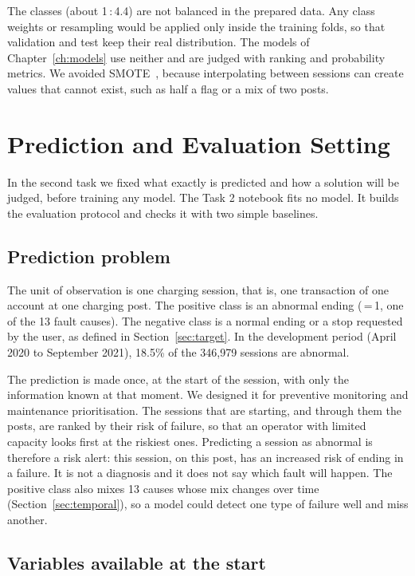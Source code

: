 \documentclass[12pt,a4paper,openany]{report}
\begin{document}
The classes (about 1\,:\,4.4) are not balanced in the prepared data. Any class weights or resampling would be
applied only inside the training folds, so that validation and test keep their real distribution. The models of
Chapter~\ref{ch:models} use neither and are judged with ranking and probability metrics. We avoided
\ac{SMOTE}~\cite{mindd03}, because interpolating between sessions can create values that cannot exist, such as half a flag or a mix of two
posts.

\chapter{Prediction and Evaluation Setting}\label{ch:eval}

In the second task we fixed what exactly is predicted and how a solution will be judged, before training any
model. The Task 2 notebook fits no model. It builds the evaluation protocol and checks it with
two simple baselines.

\section{Prediction problem}\label{sec:problem}

The unit of observation is one charging session, that is, one transaction of one account at one charging post.
The positive class is an abnormal ending (\,=\,1, one of the 13 fault causes). The negative
class is a normal ending or a stop requested by the user, as defined in Section~\ref{sec:target}. In the
development period (April 2020 to September 2021), 18.5\% of the 346,979 sessions are abnormal.

The prediction is made once, at the start of the session, with only the information known at that moment. We
designed it for preventive monitoring and maintenance prioritisation. The sessions that are starting, and through
them the posts, are ranked by their risk of failure, so that an operator with limited capacity looks first at the
riskiest ones. Predicting a session as abnormal is therefore a risk alert: this session, on this post, has an
increased risk of ending in a failure. It is not a diagnosis and it does not say which fault will happen. The
positive class also mixes 13 causes whose mix changes over time (Section~\ref{sec:temporal}), so a model could
detect one type of failure well and miss another.

\section{Variables available at the start}\label{sec:variables}
\end{document}
